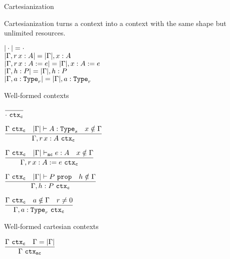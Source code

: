 \begin{frame}{Cartesianization}

Cartesianization turns a context into a context with the same shape but unlimited resources.

\begin{center}
  $| \cdot | = \cdot$ \\
  $\cartesianize{\extend{\Gamma}[r]{x}{A}} = \extend{\cartesianize{\Gamma}}{x}{A}$ \\
  $\cartesianize{\extend{\Gamma}[r]{x}{A}[e]} = \extend{\cartesianize{\Gamma}}{x}{A}[e]$ \\
  $| \Gamma, h : P | = | \Gamma |, h : P$ \\
  $\cartesianize{\extendtype{\Gamma}{a}[r]} = \extendtype{\cartesianize{\Gamma}}{a}[r]$
\end{center}

\end{frame}

\begin{frame}{Well-formed contexts}

\begin{center}
  $\infrule{}{\ctx[\computable]{\emptyctx}}$

  \vspace{2em}

  $\infrule{\ctx[\computable]{\Gamma} \quad \type[\cartesianize{\Gamma}]{A}[s] \quad \sidecond{x \notin \Gamma}}{\ctx[\computable]{\extend{\Gamma}[r]{x}{A}}}$

  \vspace{2em}

  $\infrule{\ctx[\computable]{\Gamma} \quad \typing[\cartesianize{\Gamma}][\noncomputable]{e}{A} \quad \sidecond{x \notin \Gamma}}{\ctx[\computable]{\extend{\Gamma}[r]{x}{A}[e]}}$

  \vspace{2em}

  $\infrule{\ctx[\computable]{\Gamma} \quad \prop[\cartesianize{\Gamma}]{P} \quad \sidecond{h \notin \Gamma}}{\ctx[\computable]{\assume{\Gamma}{h}{P}}}$

  \vspace{2em}

  $\infrule{\ctx[\computable]{\Gamma} \quad a \notin \Gamma \quad r \neq \Zero}{\ctx[\computable]{\extendtype{\Gamma}{a}[r]}}$
\end{center}

\end{frame}

\begin{frame}{Well-formed cartesian contexts}

\begin{center}
  $\infrule{\ctx[\computable]{\Gamma} \quad \sidecond{\Gamma = \cartesianize{\Gamma}}}{\ctx[\noncomputable]{\Gamma}}$
\end{center}

\end{frame}